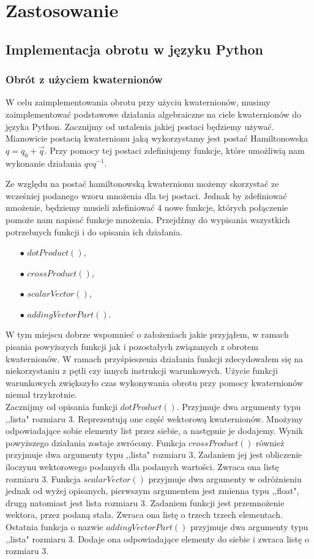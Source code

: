\documentclass[a4paper,twoside,11pt,reqno]{mwrep}
\theoremstyle{plain} \newtheorem{twr}{Twierdzenie}
\theoremstyle{plain} \newtheorem{lem}{Lemat}
\theoremstyle{definition} \newtheorem{defi}{Definicja}
\theoremstyle{remark} \newtheorem*{wni}{Wniosek}
\theoremstyle{definition} \newtheorem{uwaga}{Uwaga}
\theoremstyle{definition}\newtheorem{prz}{Przykład}
\begin{document}
\chapter{Zastosowanie}
\section{Implementacja obrotu w języku Python}
\subsection{Obrót z użyciem kwaternionów}
W celu zaimplementowania obrotu przy użyciu kwaternionów, musimy zaimplementować
podstawowe działania algebraiczne na ciele kwaternionów do języka Python.
Zacznijmy od ustalenia jakiej postaci będziemy używać. Mianowicie postacią
kwaternionu jaką wykorzystamy jest postać Hamiltonowska $q=q_0+\overrightarrow{q}$.
Przy pomocy tej postaci zdefiniujemy funkcje, które umożliwią nam wykonanie 
działania $qvq^{-1}$.
 

Ze względu na postać hamiltonowską kwaternionu możemy skorzystać ze wcześniej podanego
wzoru mnożenia dla tej postaci. Jednak by zdefiniować mnożenie, będziemy musieli
zdefiniować $4$ nowe funkcje, których połączenie pomoże nam napisać
funkcje mnożenia. Przejdźmy do wypisania wszystkich potrzebnych funkcji i do
opisania ich działania.
\begin{itemize}
\item[$\bullet$] $dotProduct()$,
\item[$\bullet$] $crossProduct()$,
\item[$\bullet$] $scalarVector()$,
\item[$\bullet$] $addingVectorPart()$.
\end{itemize} 
W tym miejscu dobrze wspomnieć o założeniach jakie przyjąłem, 
w ramach pisania powyższych funkcji jak i pozostałych związanych z obrotem kwaternionów.
W ramach przyśpieszenia działania funkcji zdecydowałem się na niekorzystaniu z pętli czy
innych instrukcji warunkowych. Użycie funkcji warunkowych zwiększyło czas wykonywania 
obrotu przy pomocy kwaternionów niemal trzykrotnie.\\
Zacznijmy od opisania funkcji $dotProduct()$. Przyjmuje dwa argumenty typu ,,lista" rozmiaru $3$.
Reprezentują one część wektorową kwaternionów. Mnożymy odpowiadające sobie elementy list przez siebie, 
a następnie je dodajemy. Wynik powyższego działania zostaje zwrócony.
Funkcja $crossProduct()$ również przyjmuje dwa argumenty typu ,,lista" rozmiaru $3$.
Zadaniem jej jest obliczenie iloczynu wektorowego podanych dla podanych wartości.
Zwraca ona listę rozmiaru $3$. Funkcja $scalarVector()$ przyjmuje dwa argumenty
w odróżnieniu jednak od wyżej opisanych, pierwszym argumentem jest zmienna typu ,,float", drugą
natomiast jest lista rozmiaru $3$. Zadaniem funkcji jest przemnożenie wektora, przez podaną stała.
Zwraca ona listę o trzech trzech elementach. Ostatnia funkcja o nazwie $addingVectorPart()$ przyjmuje 
dwa argumenty typu ,,lista" rozmiaru $3$. Dodaje ona odpowiadające elementy do siebie
i zwraca listę o rozmiaru $3$.\\
\end{document}
